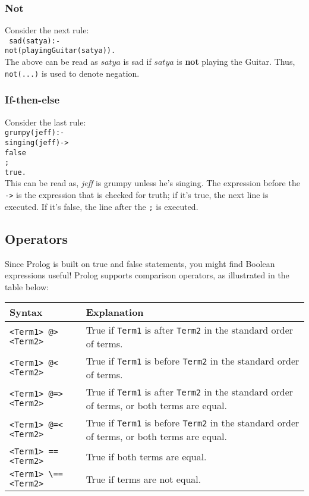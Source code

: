 \documentclass{article}
\newcommand\tab[1][1cm]{\hspace*{#1}}
\begin{document}
\subsubsection{Not}
Consider the next rule:\\

\verb| sad(satya):-|\\
\tab \verb|not(playingGuitar(satya)).|\\

The above can be read as $satya$ is sad if $satya$ is \textbf{not} playing the Guitar. Thus, \verb|not(...)| is used to denote negation.

\subsubsection{If-then-else}
Consider the last rule:\\
\verb|grumpy(jeff):-|\\
\tab \verb|singing(jeff)->|\\
\tab \tab \verb|false|\\
\tab \verb|;|\\
\tab \tab \verb|true.|\\

This can be read as, \textit{jeff} is grumpy unless he's singing. The expression before the \verb|->| is the expression that is checked for truth; if it's true, the next line is executed. If it's false, the line after the \verb|;| is executed. 

\subsection{Operators}
Since Prolog is built on true and false statements, you might find Boolean expressions useful! Prolog supports comparison operators, as illustrated in the table below:

\begin{center}
\begin{tabular}
{ | p{4cm} | p{7cm} | } 
\hline
Syntax & Explanation\\
\hline
\verb|<Term1> @> <Term2>| & True if \verb|Term1| is after \verb|Term2| in the standard order of terms. \\
\hline
\verb|<Term1> @<  <Term2>| & True if \verb|Term1| is before \verb|Term2| in the standard order of terms. \\
\hline
\verb|<Term1> @=>  <Term2>| & True if \verb|Term1| is after \verb|Term2| in the standard order of terms, or both terms are equal. \\
\hline
\verb|<Term1> @=<  <Term2>| & True if \verb|Term1| is before \verb|Term2| in the standard order of terms, or both terms are equal. \\
\hline
\verb|<Term1> == <Term2>| & True if both terms are equal.\\
\hline
\verb|<Term1> \== <Term2>| & True if terms are not equal. \\
\hline
\end{tabular}
\end{center}
\end{document}
